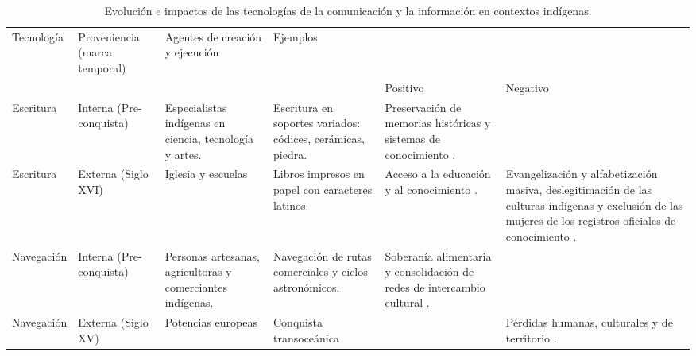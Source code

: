 \documentclass[spanish]{textolivre}
\begin{document}
\begin{footnotesize}
\begingroup
\setlength{\tabcolsep}{3pt}
\begin{longtable}{
    >{\raggedright\arraybackslash}p{1.5cm}
    >{\raggedright\arraybackslash}p{2cm}
    >{\raggedright\arraybackslash}p{2cm}
    >{\raggedright\arraybackslash}p{2cm}
    >{\raggedright\arraybackslash}p{3cm}
    >{\raggedright\arraybackslash}p{3cm}
}
\caption{Evolución e impactos de las tecnologías de la comunicación y la información en contextos indígenas.}
\label{tab1}\\
\toprule
Tecnología &
Proveniencia (marca temporal) &
Agentes de creación y ejecución &
Ejemplos &
\multicolumn{2}{c}{Impacto reportado en comunidades indígenas} \\
& & & & Positivo & Negativo \\
\midrule
Escritura &
Interna (Pre-conquista) &
Especialistas indígenas en ciencia, tecnología y artes. &
Escritura en soportes variados: códices, cerámicas, piedra. &
Preservación de memorias históricas y sistemas de conocimiento
\cite{Chemla2005,FernandezSabido2012,Yacaman1996,Lenoir1998}. & \\

Escritura &
Externa (Siglo XVI) &
Iglesia y escuelas &
Libros impresos en papel con caracteres latinos. &
Acceso a la educación y al conocimiento
\cite{Bielenberg1999}. &
Evangelización y alfabetización masiva, deslegitimación de las culturas indígenas y exclusión de las mujeres de los registros oficiales de conocimiento
\cite{Bielenberg1999,Chemla2005,Day2006,GarcesVelasquez2020,Holmes2003,LlanesOrtiz2023,Janetsky2022}. \\

Navegación &
Interna (Pre-conquista) &
Personas artesanas, agricultoras y comerciantes indígenas. &
Navegación de rutas comerciales y ciclos astronómicos. &
Soberanía alimentaria y consolidación de redes de intercambio cultural
\cite{Valladolid2007,Yacaman1996}. & \\

Navegación &
Externa (Siglo XV) &
Potencias europeas &
Conquista transoceánica &
&
Pérdidas humanas, culturales y de territorio
\cite{Day2006,GutierrezFonseca2021,MallenRivera2012}. \\


\end{longtable}
\end{footnotesize}
\end{document}

